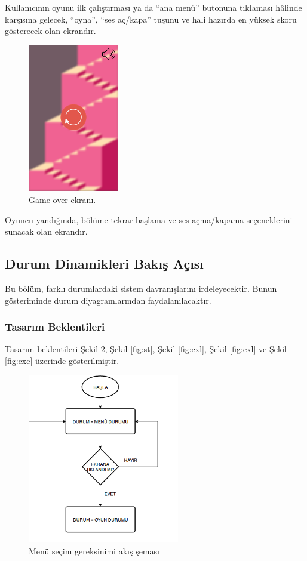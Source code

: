 \documentclass[12pt,a4paper]{article}
\begin{document}
   Kullanıcının oyunu ilk çalıştırması ya da “ana menü” butonuna tıklaması hâlinde karşısına gelecek, “oyna”, “ses aç/kapa” tuşunu ve hali hazırda en yüksek skoru gösterecek olan ekrandır.

   \begin{figure}
      \begin{center}
         \includegraphics[width=150px]{img/img8}
         \caption{Game over ekranı.}
         \label{fig:sekiz}
      \end{center}
   \end{figure}

   Oyuncu yandığında, bölüme tekrar başlama ve ses açma/kapama seçeneklerini sunacak olan ekrandır.

   \subsection{Durum Dinamikleri Bakış Açısı}
   Bu bölüm, farklı durumlardaki sistem davranışlarını irdeleyecektir. Bunun gösteriminde durum diyagramlarından faydalanılacaktır.

   \subsubsection{Tasarım Beklentileri}
   Tasarım beklentileri Şekil \ref{fig:menu}, Şekil \ref{fig:st}, Şekil \ref{fig:cxl}, Şekil \ref{fig:exl} ve Şekil \ref{fig:cxe} üzerinde gösterilmiştir.

   \begin{figure}[!htb]
      \begin{center}
            \includegraphics[width=250px]{img/menu.png}
            \caption{Menü seçim gereksinimi akış şeması}
            \label{fig:menu}
      \end{center}
   \end{figure}
\end{document}
